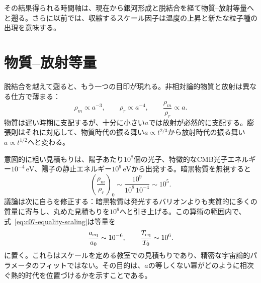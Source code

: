 \begin{classroomqa}
\end{classroomqa}

\begin{classroomqa}
\end{classroomqa}

その結果得られる時間軸は、現在から銀河形成と脱結合を経て物質--放射等量へと遡る。さらに以前では、収縮するスケール因子は温度の上昇と新たな粒子種の出現を意味する。

\section{物質--放射等量}

脱結合を越えて遡ると、もう一つの目印が現れる。非相対論的物質と放射は異なる仕方で薄まる：
\begin{equation}
\rho_m\propto a^{-3},
\qquad
\rho_r\propto a^{-4},
\qquad
\frac{\rho_m}{\rho_r}\propto a.
\label{eq:c07-equality-scaling}
\end{equation}
物質は遅い時期に支配するが、十分に小さい\(a\)では放射が必然的に支配する。膨張則はそれに対応して、物質時代の振る舞い\(a\propto t^{2/3}\)から放射時代の振る舞い\(a\propto t^{1/2}\)へと変わる。

意図的に粗い見積もりは、陽子あたり\(10^8\)個の光子、特徴的なCMB光子エネルギー\(10^{-4}\,\mathrm{eV}\)、陽子の静止エネルギー\(10^9\,\mathrm{eV}\)から出発する。暗黒物質を無視すると
\begin{equation}
\left(\frac{\rho_m}{\rho_r}\right)_0
\sim
\frac{10^9}{10^8\,10^{-4}}
\sim10^5.
\end{equation}
議論は次に自らを修正する：暗黒物質は発光するバリオンよりも実質的に多くの質量に寄与し、丸めた見積もりを\(10^6\)へと引き上げる。この算術の範囲内で、式~\eqref{eq:c07-equality-scaling}は等量を
\begin{equation}
\frac{a_{\rm eq}}{a_0}\sim10^{-6},
\qquad
\frac{T_{\rm eq}}{T_0}\sim10^6.
\label{eq:c07-equality-estimate}
\end{equation}
に置く。これらはスケールを定める教室での見積もりであり、精密な宇宙論的パラメータのフィットではない。その目的は、\(a\)の等しくない冪がどのように相次ぐ熱的时代を位置づけるかを示すことである。

